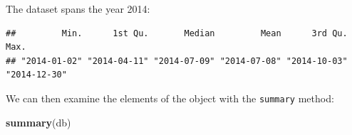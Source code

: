 \documentclass[]{book}
\newenvironment{Shaded}{\begin{snugshade}}{\end{snugshade}}
\newcommand{\KeywordTok}[1]{\textcolor[rgb]{0.13,0.29,0.53}{\textbf{#1}}}
\newcommand{\StringTok}[1]{\textcolor[rgb]{0.31,0.60,0.02}{#1}}
\newcommand{\CommentTok}[1]{\textcolor[rgb]{0.56,0.35,0.01}{\textit{#1}}}
\newcommand{\OperatorTok}[1]{\textcolor[rgb]{0.81,0.36,0.00}{\textbf{#1}}}
\newcommand{\NormalTok}[1]{#1}
\begin{document}
The dataset spans the year 2014:

\begin{Shaded}
\end{Shaded}

\begin{verbatim}
##         Min.      1st Qu.       Median         Mean      3rd Qu.         Max. 
## "2014-01-02" "2014-04-11" "2014-07-09" "2014-07-08" "2014-10-03" "2014-12-30"
\end{verbatim}

We can then examine the elements of the object with the \texttt{summary}
method:

\begin{Shaded}
\begin{Highlighting}[]
\KeywordTok{summary}\NormalTok{(db)}
\end{Highlighting}
\end{Shaded}
\end{document}
